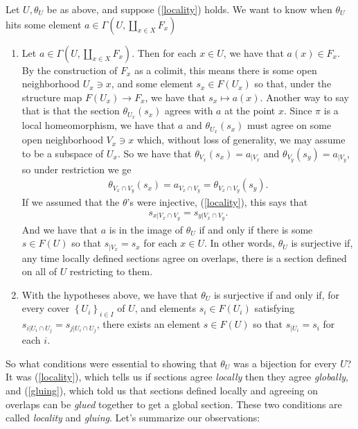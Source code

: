 \documentclass[11pt]{amsart}
\begin{document}
\begin{lemma}
\label{lem:theta-epimorphism}
Let $U,\theta_U$ be as above, and suppose (\ref{locality}) holds. We want to know when $\theta_U$ hits some element $a\in \Gamma(U,\amalg_{x\in X}F_x)$
\begin{enumerate}
    \item Let $a\in \Gamma(U,\amalg_{x\in X}F_x)$. Then for each $x\in U$, we have that $a(x) \in F_x$. By the construction of $F_x$ as a colimit, this means there is some open neighborhood $U_x \ni x$, and some element $s_x \in F(U_x)$ so that, under the structure map $F(U_x) \to F_x$, we have that $s_x \mapsto a(x)$. Another way to say that is that the section $\theta_{U_x}(s_x)$ agrees with $a$ at the point $x$. Since $\pi$ is a local homeomorphism, we have that $a$ and $\theta_{U_x}(s_x)$ must agree on some open neighborhood $V_x \ni x$ which, without loss of generality, we may assume to be a subspace of $U_x$. So we have that $\theta_{V_x}(s_x) = a_{|V_x}$ and $\theta_{V_y}(s_y) = a_{|V_y}$, so under restriction we ge
\begin{align*}
        \theta_{V_x \cap V_y}(s_x) = a_{V_x \cap V_y} =  \theta_{V_x\cap V_y}(s_y).
    \end{align*}
    If we assumed that the $\theta$'s were injective, (\ref{locality}), this says that
    \begin{align*}
        s_{x|V_x \cap V_y} = s_{y | V_x \cap V_y}.
    \end{align*}
    And we have that $a$ is in the image of $\theta_U$ if and only if there is some $s\in F(U)$ so that $s_{|V_x} = s_x$ for each $x\in U$. In other words, $\theta_U$ is surjective if, any time locally defined sections agree on overlaps, there is a section defined on all of $U$ restricting to them.
    \item\label{gluing} With the hypotheses above, we have that $\theta_U$ is surjective if and only if, for every cover $\left\{ U_i \right\}_{i\in I}$ of $U$, and elements $s_i \in F(U_i)$ satisfying $s_{i | U_i\cap U_j} = s_{j|U_i \cap U_j}$, there exists an element $s\in F(U)$ so that $s_{|U_i} = s_i$ for each $i$.
\end{enumerate}
\end{lemma}

So what conditions were essential to showing that $\theta_U$ was a bijection for every $U$? It was (\ref{locality}), which tells us if sections agree \emph{locally} then they agree \emph{globally}, and (\ref{gluing}), which told us that sections defined locally and agreeing on overlaps can be \emph{glued} together to get a global section. These two conditions are called \emph{locality} and \emph{gluing}. Let's summarize our observations:
\end{document}
